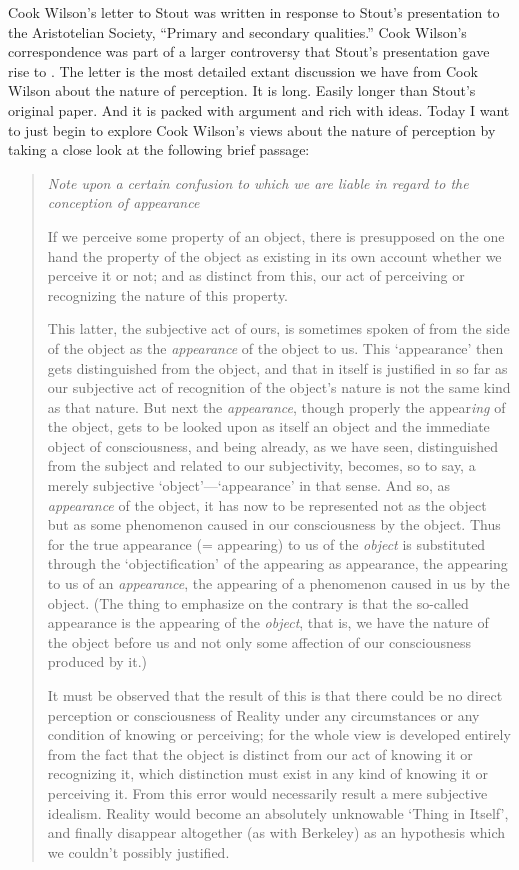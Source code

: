 \documentclass[12pt]{article}
\begin{document}
Cook Wilson's letter to Stout was written in response to Stout's \citeyearpar{Stout:1903zl} presentation to the Aristotelian Society, ``Primary and secondary qualities.'' Cook Wilson's correspondence was part of a larger controversy that Stout's presentation gave rise to \citep[see][for how this debate played out in Edwardian philosophy]{Nassim:2008fk}. The letter is the most detailed extant discussion we have from Cook Wilson about the nature of perception. It is long. Easily longer than Stout's original paper. And it is packed with argument and rich with ideas. Today I want to just begin to explore Cook Wilson's views about the nature of perception by taking a close look at the following brief passage:
\begin{quotation}
	\noindent \emph{Note upon a certain confusion to which we are liable in regard to the conception of appearance}
	
	If we perceive some property of an object, there is presupposed on the one hand the property of the object as existing in its own account whether we perceive it or not; and as distinct from this, our act of perceiving or recognizing the nature of this property.
	
	This latter, the subjective act of ours, is sometimes spoken of from the side of the object as the \emph{appearance} of the object to us. This `appearance' then gets distinguished from the object, and that in itself is justified in so far as our subjective act of recognition of the object's nature is not the same kind as that nature. But next the \emph{appearance}, though properly the appear\emph{ing} of the object, gets to be looked upon as itself an object and the immediate object of consciousness, and being already, as we have seen, distinguished from the subject and related to our subjectivity, becomes, so to say, a merely subjective `object'---`appearance' in that sense. And so, as \emph{appearance} of the object, it has now to be represented not as the object but as some phenomenon caused in our consciousness by the object. Thus for the true appearance (= appearing) to us of the \emph{object} is substituted through the `objectification' of the appearing as appearance, the appearing to us of an \emph{appearance}, the appearing of a phenomenon caused in us by the object. (The thing to emphasize on the contrary is that the so-called appearance is the appearing of the \emph{object}, that is, we have the nature of the object before us and not only some affection of our consciousness produced by it.)

	It must be observed that the result of this is that there could be no direct perception or consciousness of Reality under any circumstances or any condition of knowing or perceiving; for the whole view is developed entirely from the fact that the object is distinct from our act of knowing it or recognizing it, which distinction must exist in any kind of knowing it or perceiving it. From this error would necessarily result a mere subjective idealism. Reality would become an absolutely unknowable `Thing in Itself', and finally disappear altogether (as with Berkeley) as an hypothesis which we couldn't possibly justified. \citep[\emph{Correspondence with Stout 1904},][796-797]{Cook-Wilson:1926sf}
\end{quotation}
\end{document}
